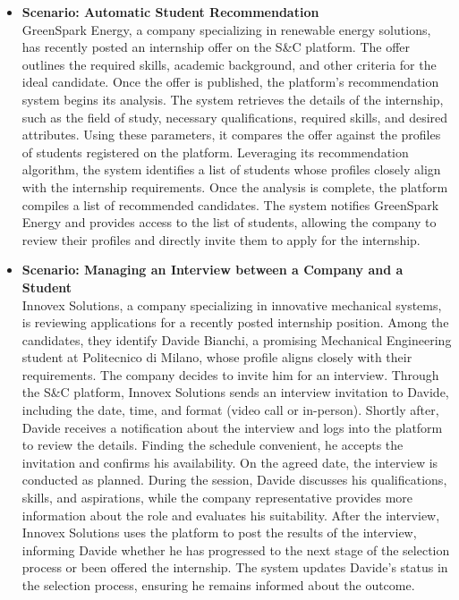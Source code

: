 \begin{itemize}
        \incscenario
    \item \textbf{\nth{\thescenario} Scenario: Automatic Student Recommendation}
    \\
        GreenSpark Energy, a company specializing in renewable energy solutions, has recently posted an internship offer on the S\&C platform. The offer outlines the required skills, academic background, and other criteria for the ideal candidate. Once the offer is published, the platform's recommendation system begins its analysis.
        The system retrieves the details of the internship, such as the field of study, necessary qualifications, required skills, and desired attributes. Using these parameters, it compares the offer against the profiles of students registered on the platform. Leveraging its recommendation algorithm, the system identifies a list of students whose profiles closely align with the internship requirements.
        Once the analysis is complete, the platform compiles a list of recommended candidates. The system notifies GreenSpark Energy and provides access to the list of students, allowing the company to review their profiles and directly invite them to apply for the internship. 
        \incscenario
    \item \textbf{\nth{\thescenario} Scenario: Managing an Interview between a Company and a Student}
    \\
        Innovex Solutions, a company specializing in innovative mechanical systems, is reviewing applications for a recently posted internship position. Among the candidates, they identify Davide Bianchi, a promising Mechanical Engineering student at Politecnico di Milano, whose profile aligns closely with their requirements. The company decides to invite him for an interview.
        Through the S\&C platform, Innovex Solutions sends an interview invitation to Davide, including the date, time, and format (video call or in-person). Shortly after, Davide receives a notification about the interview and logs into the platform to review the details. Finding the schedule convenient, he accepts the invitation and confirms his availability.
        On the agreed date, the interview is conducted as planned. During the session, Davide discusses his qualifications, skills, and aspirations, while the company representative provides more information about the role and evaluates his suitability.
        After the interview, Innovex Solutions uses the platform to post the results of the interview, informing Davide whether he has progressed to the next stage of the selection process or been offered the internship.
        The system updates Davide's status in the selection process, ensuring he remains informed about the outcome. 
        \incscenario
        

\end{itemize}
